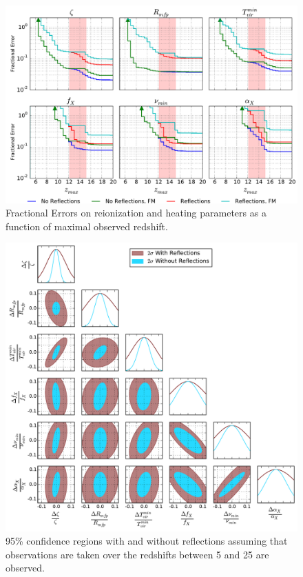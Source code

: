 \documentclass[preprint]{emulateapj}
\begin{document}
\begin{figure}
\includegraphics[width=\textwidth]{figures/sigmaVsZ.pdf}
\caption{Fractional Errors on reionization and heating parameters as a function of maximal observed redshift.}
\end{figure}

\begin{figure}
\includegraphics[width=\textwidth]{figures/triangle_hera331.pdf}
\caption{95\% confidence regions with and without reflections assuming that observations are taken over the redshifts between 5 and 25 are observed.}
\end{figure}
\end{document}
